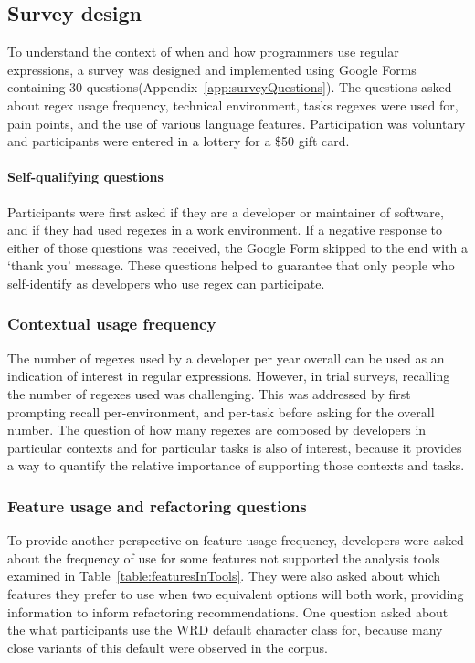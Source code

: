 \subsection{Survey design}

To understand the context of when and how programmers use regular expressions, a survey was designed and implemented using Google Forms containing 30 questions(Appendix~\ref{app:surveyQuestions}). The questions asked about regex usage frequency, technical environment, tasks regexes were used for, pain points, and the use of various language
features. Participation was voluntary and participants were entered in a lottery for a \$50 gift card.


\paragraph{Self-qualifying questions} Participants were first asked if they are a developer or maintainer of software, and if they had used regexes in a work environment.  If a negative response to either of those questions was received, the Google Form skipped to the end with a `thank you' message.  These questions helped to guarantee that only people who self-identify as developers who use regex can participate.

\subsubsection{Contextual usage frequency}
The number of regexes used by a developer per year overall can be used as an indication of interest in regular expressions.  However, in trial surveys, recalling the number of regexes used was challenging.  This was addressed by first prompting recall per-environment, and per-task before asking for the overall number.  The question of how many regexes are composed by developers in particular contexts and for particular tasks is also of interest, because it provides a way to quantify the relative importance of supporting those contexts and tasks.

\subsubsection{Feature usage and refactoring questions}
To provide another perspective on feature usage frequency, developers were asked about the frequency of use for some features not supported the analysis tools examined in Table~\ref{table:featuresInTools}.  They were also asked about which features they prefer to use when two equivalent options will both work, providing information to inform refactoring recommendations.  One question asked about the what participants use the WRD default character class for, because many close variants of this default were observed in the corpus.

